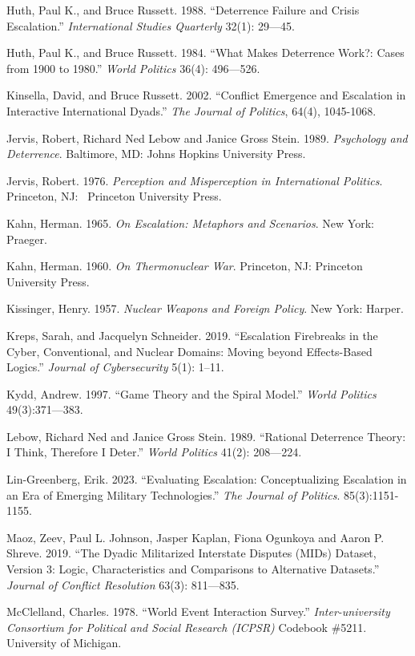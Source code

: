 \documentclass[
  letterpaper,
  DIV=11,
  numbers=noendperiod]{scrartcl}
\begin{document}
Huth, Paul K., and Bruce Russett. 1988. ``Deterrence Failure and Crisis
Escalation.'' \emph{International Studies Quarterly} 32(1): 29---45.

Huth, Paul K., and Bruce Russett. 1984. ``What Makes Deterrence Work?:
Cases from 1900 to 1980.'' \emph{World Politics} 36(4): 496---526.

Kinsella, David, and Bruce Russett. 2002. ``Conflict Emergence and
Escalation in Interactive International Dyads.'' \emph{The Journal of
Politics}, 64(4), 1045-1068.

Jervis, Robert, Richard Ned Lebow and Janice Gross Stein. 1989.
\emph{Psychology and Deterrence}. Baltimore, MD: Johns Hopkins
University Press.

Jervis, Robert. 1976. \emph{Perception and Misperception in
International Politics}. Princeton, NJ:~ Princeton University Press.

Kahn, Herman. 1965. \emph{On Escalation: Metaphors and Scenarios}. New
York: Praeger.

Kahn, Herman. 1960. \emph{On Thermonuclear War}. Princeton, NJ:
Princeton University Press.

Kissinger, Henry. 1957. \emph{Nuclear Weapons and Foreign Policy}. New
York: Harper.

Kreps, Sarah, and Jacquelyn Schneider. 2019. ``Escalation Firebreaks in
the Cyber, Conventional, and Nuclear Domains: Moving beyond
Effects-Based Logics.'' \emph{Journal of Cybersecurity} 5(1): 1--11.

Kydd, Andrew. 1997. ``Game Theory and the Spiral Model.'' \emph{World
Politics} 49(3):371---383.

Lebow, Richard Ned and Janice Gross Stein. 1989. ``Rational Deterrence
Theory: I Think, Therefore I Deter.'' \emph{World Politics} 41(2):
208---224.

Lin-Greenberg, Erik. 2023. ``Evaluating Escalation: Conceptualizing
Escalation in an Era of Emerging Military Technologies.'' \emph{The
Journal of Politics}. 85(3):1151-1155.

Maoz, Zeev, Paul L. Johnson, Jasper Kaplan, Fiona Ogunkoya and Aaron P.
Shreve. 2019. ``The Dyadic Militarized Interstate Disputes (MIDs)
Dataset, Version 3: Logic, Characteristics and Comparisons to
Alternative Datasets.'' \emph{Journal of Conflict Resolution} 63(3):
811---835.~

McClelland, Charles. 1978. ``World Event Interaction Survey.''
\emph{Inter-university Consortium for Political and Social Research
(ICPSR)} Codebook \#5211. University of Michigan.
\end{document}
